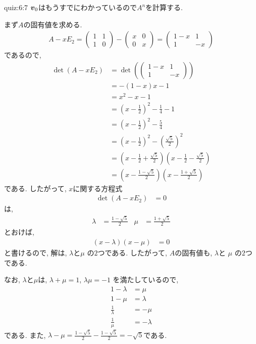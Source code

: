 \begin{answerof}{quiz:6:7}
$\boldsymbol{v}_0$はもうすでにわかっているので$A^n$を計算する.

まず$A$の固有値を求める.
\begin{align*}
  A-xE_2=\begin{pmatrix}1&1\\1&0\end{pmatrix}-\begin{pmatrix}x&0\\0&x\end{pmatrix}
=\begin{pmatrix}1-x&1\\1&-x\end{pmatrix}
\end{align*}
であるので,
\begin{align*}
  \det(A-xE_2)&=\det(\begin{pmatrix}1-x&1\\1&-x\end{pmatrix})\\
    &=-(1-x)x-1\\
    &=x^2-x-1\\
    &=\left(x-\frac{1}{2}\right)^2-\frac{1}{4}-1\\
    &=\left(x-\frac{1}{2}\right)^2-\frac{5}{4}\\\
    &=\left(x-\frac{1}{2}\right)^2-\left(\frac{\sqrt{5}}{2}\right)^2\\
    &=\left(x-\frac{1}{2}+\frac{\sqrt{5}}{2}\right)\left(x-\frac{1}{2}-\frac{\sqrt{5}}{2}\right)\\
    &=\left(x-\frac{1-\sqrt{5}}{2}\right)\left(x-\frac{1+\sqrt{5}}{2}\right)
\end{align*}
である.
したがって, $x$に関する方程式
\begin{align*}
  \det(A-xE_2)&=0
\end{align*}
は,
\begin{align*}
\lambda&=\frac{1-\sqrt{5}}{2}&
\mu&=\frac{1+\sqrt{5}}{2}
\end{align*}
とおけば,
\begin{align*}
  \left(x-\lambda\right)\left(x-\mu\right)&=0
\end{align*}
と書けるので,
解は, $\lambda$と$\mu$
の$2$つである.
したがって,
$A$の固有値も,
$\lambda$と
$\mu$
の$2$つである.


なお,
$\lambda$と$\mu$は,
$\lambda+\mu=1$,
$\lambda\mu=-1$
を満たしているので,
\begin{align*}
  1-\lambda&=\mu\\
  1-\mu&=\lambda\\
\frac{1}{\lambda}&=-\mu\\
\frac{1}{\mu}&=-\lambda
\end{align*}
である.
また,
$\lambda-\mu=\frac{1-\sqrt{5}}{2}-\frac{1-\sqrt{5}}{2}=-\sqrt{5}$である.




\end{answerof}

